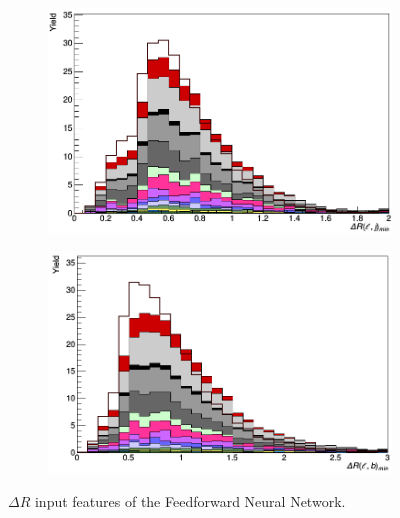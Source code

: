 \begin{figure}[H]
\begin{subfigure}{.5\textwidth}
\end{subfigure}
\begin{subfigure}{.5\textwidth}
  \centering
  \includegraphics[width=.99\linewidth]{figs/features/deltaR_lj_min}
\end{subfigure}%
\begin{subfigure}{.5\textwidth}
  \centering
  \includegraphics[width=.99\linewidth]{figs/features/deltaR_lb_min}
\end{subfigure}
\caption{$\Delta R$ input features of the Feedforward Neural Network.}
\end{figure}

\newpage


